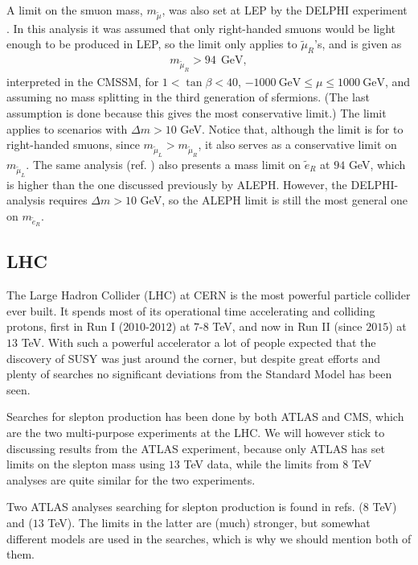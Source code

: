 \documentclass[twocolumn,a4paper,10pt]{article}
\begin{document}
A limit on the smuon mass, $m_{\tilde{\mu}}$, was also set at LEP by the DELPHI experiment 
\cite{DELPHI:2003}. In this analysis it was assumed that only right-handed smuons would be light enough 
to be produced in LEP, so the limit only applies to $\tilde{\mu}_R$'s, and is given as 
\begin{align*}
m_{\tilde{\mu}_R} > 94 \:\: \text{GeV}, 
\end{align*}
interpreted in the CMSSM, for $1<\tan\beta <40$, $-1000\:\text{GeV} \leq \mu \leq 1000 \: \text{GeV}$, 
and assuming no mass splitting in the third generation of sfermions. (The last assumption is done because 
this gives the most conservative limit.) The limit applies to scenarios with  
$\Delta m > 10$ GeV.  Notice that, although the limit is for to right-handed smuons, since 
$m_{\tilde{\mu}_L}>m_{\tilde{\mu}_R}$, it also serves as a conservative limit on $m_{\tilde{\mu}_L}$. 
The same analysis (ref. \cite{DELPHI:2003}) also presents a mass limit on $\tilde{e}_R$ at $94$ GeV, 
which is higher than the one discussed previously by ALEPH. However, the DELPHI-analysis requires 
$\Delta m > 10$ GeV, so the ALEPH limit is still the most general one on $m_{\tilde{e}_R}$.   

\subsection{LHC}

The Large Hadron Collider (LHC) at CERN is the most powerful particle collider ever built. It  
spends most of its operational time accelerating and colliding protons, first in Run I ($2010$-$2012$) 
at $7$-$8$ TeV, and now in Run II (since $2015$) at $13$ TeV. With such a powerful accelerator a lot 
of people expected that the discovery of SUSY was just around the corner, but despite great efforts 
and plenty of searches no significant deviations from the Standard Model has been seen.

Searches for slepton production has been done by both ATLAS and CMS, which are the two multi-purpose 
experiments at the LHC. We will however stick to discussing results from the ATLAS experiment, because 
only ATLAS has set limits on the slepton mass using $13$ TeV data, while the limits from $8$ TeV analyses 
are quite similar for the two experiments. 

Two ATLAS analyses searching for slepton production is found in refs. \cite{ATLAS:2014} ($8$ TeV) and 
\cite{ATLAS:2017} ($13$ TeV). The limits in the latter are (much) stronger, but somewhat different 
models are used in the searches, which is why we should mention both of them.
\end{document}
